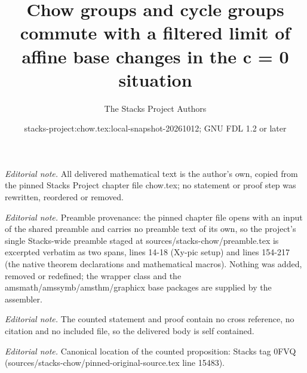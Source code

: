 \documentclass[10pt,a4paper]{amsart}
\title{Chow groups and cycle groups commute with a filtered limit of affine base changes in the c = 0 situation}
\author{The Stacks Project Authors}
\date{stacks-project:chow.tex:local-snapshot-20261012; GNU FDL 1.2 or later}
\theoremstyle{plain}
\theoremstyle{definition}
\theoremstyle{remark}
\numberwithin{equation}{subsection}
\begin{document}
\maketitle
\noindent\textit{Editorial note.} All delivered mathematical text is the author's own, copied from the pinned Stacks Project chapter file chow.tex; no statement or proof step was rewritten, reordered or removed.\par\medskip
\noindent\textit{Editorial note.} Preamble provenance: the pinned chapter file opens with an input of the shared preamble and carries no preamble text of its own, so the project's single Stacks-wide preamble staged at sources/stacks-chow/preamble.tex is excerpted verbatim as two spans, lines 14-18 (Xy-pic setup) and lines 154-217 (the native theorem declarations and mathematical macros). Nothing was added, removed or redefined; the wrapper class and the amsmath/amssymb/amsthm/graphicx base packages are supplied by the assembler.\par\medskip
\noindent\textit{Editorial note.} The counted statement and proof contain no cross reference, no citation and no included file, so the delivered body is self contained.\par\medskip
\noindent\textit{Editorial note.} Canonical location of the counted proposition: Stacks tag 0FVQ (sources/stacks-chow/pinned-original-source.tex line 15483).\par\medskip
\end{document}
